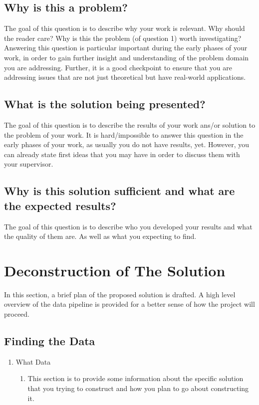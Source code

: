 \documentclass{IEEEtran}
\begin{document}
    \subsection{Why is this a problem?}
        {The goal of this question is to describe why your work is relevant. Why should the reader care? Why is this the problem (of question 1) worth investigating? Answering this question is particular important during the early phases of your work, in order to gain further insight and understanding of the problem domain you are addressing. Further, it is a good checkpoint to ensure that you are addressing issues that are not just theoretical but have real-world applications.}

    \subsection{What is the solution being presented?}
        {The goal of this question is to describe the results of your work ans/or solution to the problem of your work. It is hard/impossible to answer this question in the early phases of your work, as usually you do not have results, yet. However, you can already state first ideas that you may have in order to discuss them with your supervisor.}

    \subsection{Why is this solution sufficient and what are the expected results?}
        {
        The goal of this question is to describe who you developed your results and what the quality of them are. As well as what you expecting to find.
        }


\section{Deconstruction of The Solution}
{In this section, a brief plan of the proposed solution is drafted. A high level overview of the data pipeline is provided for a better sense of how the project will proceed.}
         \subsection{Finding the Data}
             \begin{enumerate}
                 \item What Data
                    \begin{enumerate}
                        \item {This section is to provide some information about the specific solution that you trying to construct and how you plan to go about constructing it.}
                    \end{enumerate}
             \end{enumerate}
\end{document}
